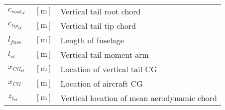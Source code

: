 \documentclass[12pt]{article}
\begin{document}
{\begin{supertabular}{lcl}
$c_{root_{vt}}$ & $~\mathrm{[m]}$ & Vertical tail root chord \\
$c_{tip_{vt}}$ & $~\mathrm{[m]}$ & Vertical tail tip chord \\
$l_{fuse}$ & $~\mathrm{[m]}$ & Length of fuselage \\
$l_{vt}$ & $~\mathrm{[m]}$ & Vertical tail moment arm \\
$x_{CG_{vt}}$ & $~\mathrm{[m]}$ & Location of vertical tail CG \\
$x_{CG}$ & $~\mathrm{[m]}$ & Location of aircraft CG \\
$z_{\bar{c}_{vt}}$ & $~\mathrm{[m]}$ & Vertical location of mean aerodynamic chord \\
\bottomrule
\end{supertabular}}

 
\end{document}
